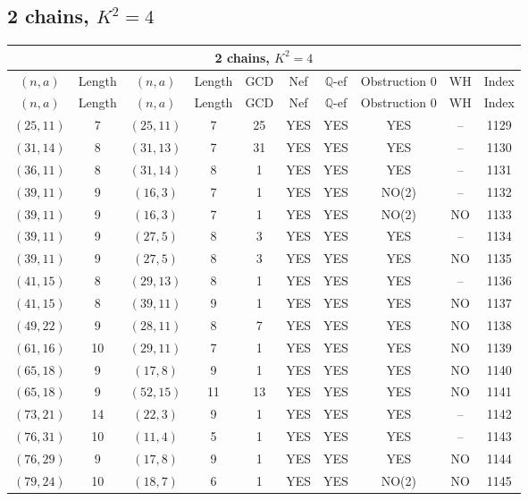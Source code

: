 \subsection{2 chains, $K^2 = 4$}
\begin{longtable}{|c|c|c|c|c|c|c|c|c|c|}
\hline
\multicolumn{10}{|c|}{2 chains, $K^2 = 4$}\\
\hline
$(n,a)$ & Length & $(n,a)$ & Length & GCD & Nef & $\mathbb Q$-ef & Obstruction 0 & WH & Index\\
\hline
\endfirsthead

\hline
$(n,a)$ & Length & $(n,a)$ & Length & GCD & Nef & $\mathbb Q$-ef & Obstruction 0 & WH & Index\\
\hline
\endhead
\hline
\endfoot

$(25, 11)$ & 7 & $(25, 11)$ & 7 & 25 & YES & YES & YES & -- & 1129\\
$(31, 14)$ & 8 & $(31, 13)$ & 7 & 31 & YES & YES & YES & -- & 1130\\
$(36, 11)$ & 8 & $(31, 14)$ & 8 & 1 & YES & YES & YES & -- & 1131\\
$(39, 11)$ & 9 & $(16, 3)$ & 7 & 1 & YES & YES & NO(2) & -- & 1132\\
$(39, 11)$ & 9 & $(16, 3)$ & 7 & 1 & YES & YES & NO(2) & NO & 1133\\
$(39, 11)$ & 9 & $(27, 5)$ & 8 & 3 & YES & YES & YES & -- & 1134\\
$(39, 11)$ & 9 & $(27, 5)$ & 8 & 3 & YES & YES & YES & NO & 1135\\
$(41, 15)$ & 8 & $(29, 13)$ & 8 & 1 & YES & YES & YES & -- & 1136\\
$(41, 15)$ & 8 & $(39, 11)$ & 9 & 1 & YES & YES & YES & NO & 1137\\
$(49, 22)$ & 9 & $(28, 11)$ & 8 & 7 & YES & YES & YES & NO & 1138\\
$(61, 16)$ & 10 & $(29, 11)$ & 7 & 1 & YES & YES & YES & NO & 1139\\
$(65, 18)$ & 9 & $(17, 8)$ & 9 & 1 & YES & YES & YES & NO & 1140\\
$(65, 18)$ & 9 & $(52, 15)$ & 11 & 13 & YES & YES & YES & NO & 1141\\
$(73, 21)$ & 14 & $(22, 3)$ & 9 & 1 & YES & YES & YES & -- & 1142\\
$(76, 31)$ & 10 & $(11, 4)$ & 5 & 1 & YES & YES & YES & -- & 1143\\
$(76, 29)$ & 9 & $(17, 8)$ & 9 & 1 & YES & YES & YES & NO & 1144\\
$(79, 24)$ & 10 & $(18, 7)$ & 6 & 1 & YES & YES & NO(2) & NO & 1145\\

\end{longtable}

